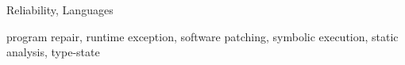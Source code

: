 \documentclass{sigplanconf}
\begin{document}

\terms
Reliability, Languages 

\keywords
program repair, runtime exception, software patching, symbolic execution, static analysis, type-state




















\acks










\end{document}
